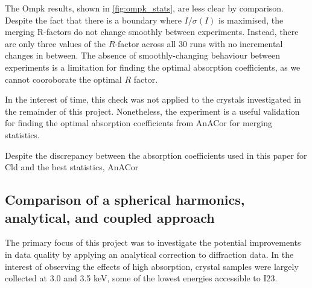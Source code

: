 The Ompk results, shown in \cref{fig:ompk_stats}, are less clear by comparison. Despite the fact that there is a boundary where $I/\sigma(I)$ is maximised, the merging R-factors do not change smoothly between experiments. Instead, there are only three values of the $R$-factor across all 30 runs with no incremental changes in between. %
The absence of smoothly-changing behaviour between experiments is a limitation for finding the optimal absorption coefficients, as we cannot cooroborate the optimal $R$ factor.%




In the interest of time, this check was not applied to the crystals investigated in the remainder of this project. Nonetheless, the experiment is a useful validation for finding the optimal absorption coefficients from AnACor for merging statistics. %

Despite the discrepancy between the absorption coefficients used in this paper for Cld and the best statistics, AnACor 

\subsection{Comparison of a spherical harmonics, analytical, and coupled approach} %
The primary focus of this project was to investigate the potential improvements in data quality by applying an analytical correction to diffraction data.
In the interest of observing the effects of high absorption, crystal samples were largely collected at 3.0 and 3.5 \unit{keV}, some of the lowest energies accessible to I23.

